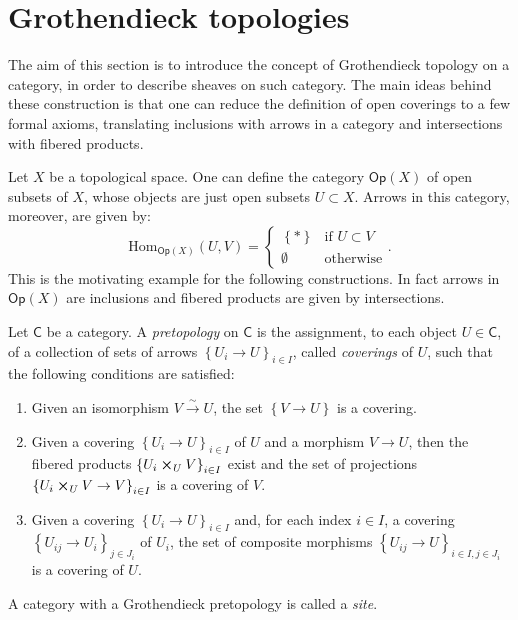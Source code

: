 \section{Grothendieck topologies}
The aim of this section is to introduce
the concept of Grothendieck topology on a category,
in order to describe sheaves on such category.
The main ideas behind these construction is that one can reduce
the definition of open coverings to a few formal axioms, translating
inclusions with arrows in a category and
intersections with fibered products.


\begin{rem}
	Let $X$ be a topological space. 
	One can define the category $\mathsf{Op}(X)$ of open subsets of $X$, whose
	objects are just open subsets $U \subset X$.
	Arrows in this category, moreover, are given by:
	\begin{equation*}
	\mathrm{Hom}_{\mathsf{Op}(X)} \left( U, V \right) =
	\begin{cases}
		\left\{ * \right\} & \text{if } U \subset V\\
		\emptyset & \text{otherwise}
	\end{cases} 
	.\end{equation*}
	This is the motivating example for the following constructions.
	In fact arrows in $\mathsf{Op}(X)$ are inclusions and
	fibered products are given by intersections.
\end{rem}


\begin{defn}[Sites]
	Let $\mathsf{C}$ be a category. 
	A {\em pretopology} on $\mathsf{C}$ is the assignment, to each object $U \in \mathsf{C}$,
	of a collection of sets of arrows $\left\{ U_{ i } \to U \right\}_{ i \in I }$,
	called {\em coverings} of $U$, such that the following conditions are satisfied:
	\begin{enumerate}
		\item Given an isomorphism $V \xrightarrow{\sim} U$, the set $\left\{ V \to U \right\}$
			is a covering.
		\item Given a covering $\left\{ U_{ i } \to U \right\}_{ i \in I }$
			of $U$ and a morphism $V \to U$, then the fibered products
			$\left\{ U_i \cross_{ U } V \right\}_{i \in I}$ exist
			and the set of projections
			$\left\{ U_i \cross_{ U } V \to V \right\}_{ i \in I }$
			is a covering of $V$.
		\item Given a covering $\left\{ U_{ i } \to U \right\}_{ i \in I }$
			and, for each index $i \in I$, a covering 
			$\left\{ U_{ ij } \to U_i \right\}_{ j \in J_i }$ of $U_i$,
			the set of composite morphisms
			$\left\{ U_{ ij } \to U \right\}_{ i \in I, j \in J_i }$
			is a covering of $U$.
	\end{enumerate}
	A category with a Grothendieck pretopology is called a {\em site}.
\end{defn}


